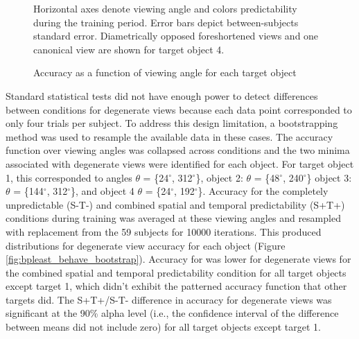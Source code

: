 \documentclass[dwyatte_dissertation.tex]{subfiles}
\begin{document}
\begin{figure}[h!]
\begin{center}
\begin{tabular}{ll}
\end{tabular}
\end{center}
\caption{Accuracy as a function of viewing angle for each target object}{Horizontal axes denote viewing angle and colors predictability during the training period. Error bars depict between-subjects standard error. Diametrically opposed foreshortened views and one canonical view are shown for target object 4.}
\label{fig:bpleast_behave_rot}
\end{figure}

Standard statistical tests did not have enough power to detect differences between conditions for degenerate views because each data point corresponded to only four trials per subject. To address this design limitation, a bootstrapping method was used to resample the available data in these cases. The accuracy function over viewing angles was collapsed across conditions and the two minima associated with degenerate views were identified for each object. For target object 1, this corresponded to angles $\theta$ = \{24$^\circ$, 312$^\circ$\}, object 2: $\theta$ = \{48$^\circ$, 240$^\circ$\} object 3: $\theta$ = \{144$^\circ$, 312$^\circ$\}, and object 4 $\theta$ = \{24$^\circ$, 192$^\circ$\}. Accuracy for the completely unpredictable (S-T-) and combined spatial and temporal predictability (S+T+) conditions during training was averaged at these viewing angles and resampled with replacement from the 59 subjects for 10000 iterations. This produced distributions for degenerate view accuracy for each object (Figure \ref{fig:bpleast_behave_bootstrap}). Accuracy for was lower for degenerate views for the combined spatial and temporal predictability condition for all target objects except target 1, which didn't exhibit the patterned accuracy function that other targets did. The S+T+/S-T- difference in accuracy for degenerate views was significant at the 90\% alpha level (i.e., the confidence interval of the difference between means did not include zero) for all target objects except target 1.
\end{document}
